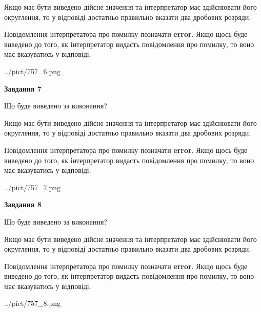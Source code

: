 \documentclass[12pt, ukrainian]{article}
\begin{document}
{\begin {Large}
Якщо має бути виведено дійсне значення та інтерпретатор має здійснювати його округлення, 
то у відповіді достатньо правильно вказати два дробових розряди.

Повідомлення інтерпретатора про помилку позначати \textbf{error}.
Якщо щось буде виведено до того, як інтерпретатор видасть повідомлення про помилку, 
то воно має вказуватись у відповіді. \par

\begin{center}
	{../pict/757_6.png}
\end{center}
\newpage

{\begin {center}\textbf{Завдання 7}\end {center}}\par
Що буде виведено за виконання? \par

Якщо має бути виведено дійсне значення та інтерпретатор має здійснювати його округлення, 
то у відповіді достатньо правильно вказати два дробових розряди.

Повідомлення інтерпретатора про помилку позначати \textbf{error}.
Якщо щось буде виведено до того, як інтерпретатор видасть повідомлення про помилку, 
то воно має вказуватись у відповіді. \par

\begin{center}
	{../pict/757_7.png}
\end{center}
\newpage

{\begin {center}\textbf{Завдання 8}\end {center}}\par
Що буде виведено за виконання? \par

Якщо має бути виведено дійсне значення та інтерпретатор має здійснювати його округлення, 
то у відповіді достатньо правильно вказати два дробових розряди.

Повідомлення інтерпретатора про помилку позначати \textbf{error}.
Якщо щось буде виведено до того, як інтерпретатор видасть повідомлення про помилку, 
то воно має вказуватись у відповіді. \par

\begin{center}
	{../pict/757_8.png}
\end{center}
\newpage


\end{Large}}
\end{document}
